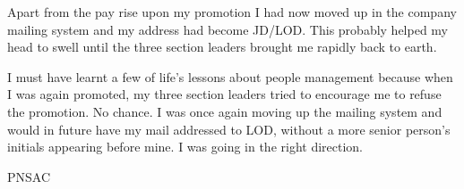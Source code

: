 Apart from the pay rise upon my promotion I had now moved up in the
company mailing system and my address had become JD/LOD. This probably
helped my head to swell until the three section leaders brought me
rapidly back to earth.

I must have learnt a few of life's lessons about people management
because when I was again promoted, my three section leaders tried to
encourage me to refuse the promotion. No chance. I was once again
moving up the mailing system and would in future have my mail
addressed to LOD, without a more senior person's initials appearing
before mine. I was going in the right direction.



\begin{footnotesize}
    \raggedleft PNSAC\\
\end{footnotesize}



